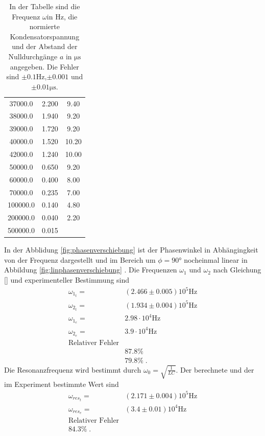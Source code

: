 \begin{table}
\begin{tabular}{c c c}
       37000.0  &  2.200  &  9.40  \\
       38000.0  &  1.940  &  9.20  \\
       39000.0  &  1.720  &  9.20  \\
       40000.0  &  1.520  & 10.20  \\
       42000.0  &  1.240  & 10.00  \\
       50000.0  &  0.650  &  9.20  \\
       60000.0  &  0.400  &  8.00  \\
       70000.0  &  0.235  &  7.00  \\
      100000.0  &  0.140  &  4.80  \\
      200000.0  &  0.040  &  2.20  \\
      500000.0  &  0.015  &        \\
  \end{tabular}
  \caption{In der Tabelle sind die Frequenz $\omega$in $\si{\hertz}$, die normierte
  Kondensatorspannung und der Abstand der Nulldurchgänge $a$ in $\si{\micro\second}$
   angegeben. Die Fehler sind
  $\pm0.1\si{\hertz}$,$ \pm0.001$ und $\pm0.01\si{\micro\second}$.
  }

  \label{fig:Messwerte}
\end{table}
In der Abblidung \ref{fig:phasenverschiebung} ist der Phasenwinkel in Abhängingkeit
von der Frequenz dargestellt und im Bereich um $\phi=90°$ nocheinmal linear in
Abbildung \ref{fig:linphasenverschiebung} . Die Frequenzen $\omega_{1}$ und
$\omega_{2}$ nach Gleichung \eqref{} und experimenteller Bestimmung sind
\begin{align*}
  \omega_{1_t}=&( 2.466\pm0.005)10^5\si{\hertz}\\
  \omega_{2_t}=&(1.934\pm0.004)10^5\si{\hertz}\\
  \omega_{1_e}=&2.98 \cdot10^4\si{\hertz}\\
  \omega_{2_e}=&3.9 \cdot10^4\si{\hertz}\\
  \text{Relativer Fehler}\\
   &87.8\%\\
   &79.8\%\;.
\end{align*}
Die Resonanzfrequenz wird bestimmt durch $\omega_0=\sqrt{\frac{1}{LC}}$.
Der berechnete und der im Experiment bestimmte Wert sind
\begin{align*}
\omega_{res_t}=&(2.171\pm0.004)10^5\si{\hertz}\\
\omega_{res_e}=&(3.4\pm0.01)10^4\si{\hertz}\\
\text{Relativer Fehler}\\
84.3\%\;.
\end{align*}
